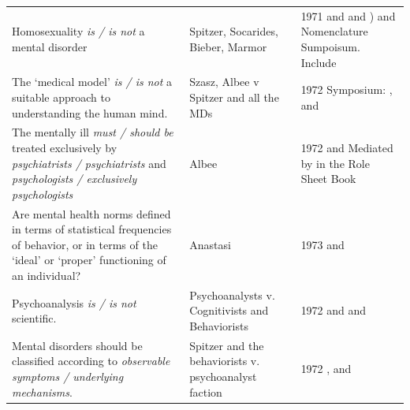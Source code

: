 \begin{refsection}
\begin{longtable}[!t]{ | P{4cm} | P{3cm} |  P{10cm} | }
&& \\ \hline \hline
Homosexuality \emph{is / is not} a mental disorder&Spitzer, Socarides, Bieber, Marmor& 1971   and      and ) \newline
  and  \newline
{}  Nomenclature Sumpoisum. Include  \\ \hline
The ‘medical model’ \emph{is / is not} a suitable approach to understanding the human mind.&Szasz, Albee v Spitzer and all the MDs&1972 Symposium: ,  and  \newline
\\ \hline
The mentally ill \emph{must / should be} treated exclusively by \emph{psychiatrists / psychiatrists} and \emph{psychologists / exclusively psychologists} &Albee&1972  and  \newline Mediated by  in the Role Sheet Book \newline
 \\ \hline
Are mental health norms defined in terms of statistical frequencies of behavior, or in terms of the ‘ideal’ or ‘proper’ functioning of an individual?& Anastasi&1973  and  \newline \\ \hline
Psychoanalysis \emph{is / is not} scientific.&Psychoanalysts v. Cognitivists and Behaviorists&1972  and   and  \newline
 \\ \hline
Mental disorders should be classified according to \emph{observable symptoms / underlying mechanisms}.&Spitzer and the behaviorists v. psychoanalyst faction&1972 ,  and  \\ \hline

\end{longtable}
\end{refsection}
